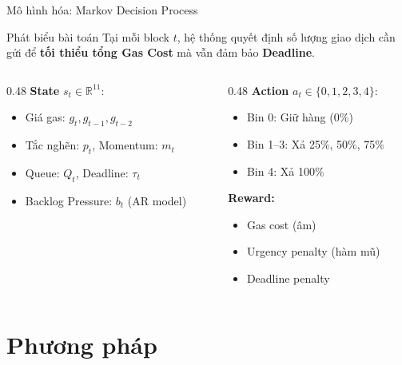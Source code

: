 \documentclass[aspectratio=169, 12pt, xcolor=table]{beamer}
\begin{document}
\begin{frame}{Mô hình hóa: Markov Decision Process}
  \begin{block}{Phát biểu bài toán}
    Tại mỗi block $t$, hệ thống quyết định số lượng giao dịch cần gửi để
    \textbf{tối thiểu tổng Gas Cost} mà vẫn đảm bảo \textbf{Deadline}.
  \end{block}
  \vspace{0.5em}
  \begin{columns}[T]
    \begin{column}{0.48\textwidth}
      \textbf{State} $s_t \in \mathbb{R}^{11}$:
      \begin{itemize}
        \item Giá gas: $g_t, g_{t-1}, g_{t-2}$
        \item Tắc nghẽn: $p_t$, Momentum: $m_t$
        \item Queue: $Q_t$, Deadline: $\tau_t$
        \item Backlog Pressure: $b_t$ (AR model)
      \end{itemize}
    \end{column}
    \begin{column}{0.48\textwidth}
      \textbf{Action} $a_t \in \{0,1,2,3,4\}$:
      \begin{itemize}
        \item Bin 0: Giữ hàng (0\%)
        \item Bin 1--3: Xả 25\%, 50\%, 75\%
        \item Bin 4: Xả 100\%
      \end{itemize}
      \vspace{0.5em}
      \textbf{Reward:}
      \begin{itemize}
        \item Gas cost (âm)
        \item Urgency penalty (hàm mũ)
        \item Deadline penalty
      \end{itemize}
    \end{column}
  \end{columns}
\end{frame}

\section{Phương pháp}
\end{document}
